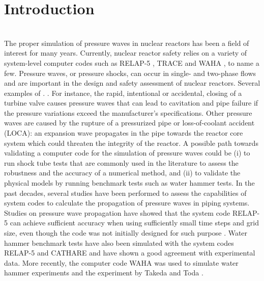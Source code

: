 \documentclass{inputs/mc2015}
\begin{document}
\section{Introduction}\label{sec:intro}
%
%
 \\
The proper simulation of pressure waves in nuclear reactors has been a field of interest for many years. Currently, nuclear reactor safety relies on a variety of system-level computer codes such as RELAP-5 \cite{relap5}, TRACE \cite{trace} and WAHA \cite{waha-manual}, to name a few. Pressure waves, or pressure shocks, can occur in single- and two-phase flows and are important in the design and safety assessment of nuclear reactors. Several examples of . . For instance, the rapid, intentional or accidental, closing of a turbine valve causes pressure waves that can lead to cavitation and pipe failure if the pressure variations exceed the manufacturer's specifications. Other pressure waves are caused by the rupture of a pressurized pipe or loss-of-coolant accident (LOCA): an expansion wave propagates in the pipe towards the reactor core   system which could threaten the integrity of the reactor. A possible path towards validating a computer code for the simulation of pressure waves could be (i) to run shock tube tests that are commonly used in the literature to assess the robustness and the accuracy of a numerical method, and (ii) to validate the physical models by running benchmark tests such as water hammer tests. In the past decades, several studies have been performed to assess the capabilities of system codes to calculate the propagation of pressure waves in piping systems. Studies on pressure wave propagation have showed that the system code RELAP-5 can achieve sufficient accuracy when using sufficiently small time steps and grid size, even though the code was not initially designed for such purpose \cite{tiselji-gale}. Water hammer benchmark tests have also been simulated with the system codes RELAP-5 \cite{Serre-bestion, bestion-serre-2012, Sokolowski-Koszela} and CATHARE \cite{cathare} and have shown a good agreement with experimental data. More recently, the computer code WAHA was used to simulate water hammer experiments \cite{waha} and the experiment by Takeda and Toda \cite{costa-tiselji}. 
\end{document}
